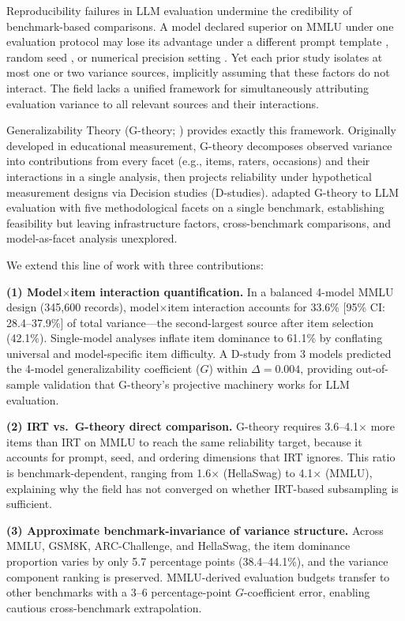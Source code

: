 \documentclass[letterpaper]{article}
\begin{document}
Reproducibility failures in LLM evaluation undermine the credibility of benchmark-based comparisons.
A model declared superior on MMLU under one evaluation protocol may lose its advantage under a different prompt template \citep{sclar2024quantifying}, random seed \citep{bui2025seed}, or numerical precision setting \citep{yuan2025precision}.
Yet each prior study isolates at most one or two variance sources, implicitly assuming that these factors do not interact.
The field lacks a unified framework for simultaneously attributing evaluation variance to all relevant sources and their interactions.

Generalizability Theory (G-theory; \citealt{shavelson1991generalizability, brennan2001generalizability}) provides exactly this framework.
Originally developed in educational measurement, G-theory decomposes observed variance into contributions from every facet (e.g., items, raters, occasions) and their interactions in a single analysis, then projects reliability under hypothetical measurement designs via Decision studies (D-studies).
\citet{mesting2026generalizability} adapted G-theory to LLM evaluation with five methodological facets on a single benchmark, establishing feasibility but leaving infrastructure factors, cross-benchmark comparisons, and model-as-facet analysis unexplored.

We extend this line of work with three contributions:

\textbf{(1) Model$\times$item interaction quantification.}
In a balanced 4-model MMLU design (345,600 records), model$\times$item interaction accounts for 33.6\% [95\% CI: 28.4--37.9\%] of total variance---the second-largest source after item selection (42.1\%).
Single-model analyses inflate item dominance to 61.1\% by conflating universal and model-specific item difficulty.
A D-study from 3 models predicted the 4-model generalizability coefficient ($G$) within $\Delta = 0.004$, providing out-of-sample validation that G-theory's projective machinery works for LLM evaluation.

\textbf{(2) IRT vs.\ G-theory direct comparison.}
G-theory requires 3.6--4.1$\times$ more items than IRT on MMLU to reach the same reliability target, because it accounts for prompt, seed, and ordering dimensions that IRT ignores.
This ratio is benchmark-dependent, ranging from 1.6$\times$ (HellaSwag) to 4.1$\times$ (MMLU), explaining why the field has not converged on whether IRT-based subsampling is sufficient.

\textbf{(3) Approximate benchmark-invariance of variance structure.}
Across MMLU, GSM8K, ARC-Challenge, and HellaSwag, the item dominance proportion varies by only 5.7 percentage points (38.4--44.1\%), and the variance component ranking is preserved.
MMLU-derived evaluation budgets transfer to other benchmarks with a 3--6 percentage-point $G$-coefficient error, enabling cautious cross-benchmark extrapolation.
\end{document}
